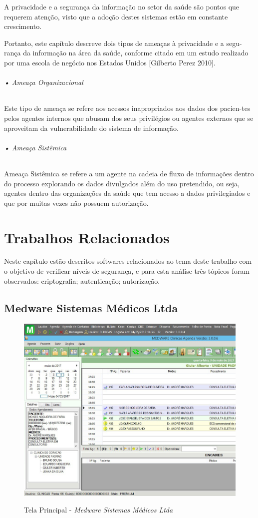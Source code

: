 \documentclass[portuguese,oneside]{tcc}
\begin{document}
A privacidade e a segurança da informação no setor da saúde são pontos que requerem atenção, visto que a adoção destes sistemas estão em constante crescimento.

Portanto, este capítulo descreve dois tipos de ameaças à privacidade e a segu-rança da informação na área da saúde, conforme citado em um estudo realizado por uma escola de negócio nos Estados Unidos [Gilberto Perez 2010].


\subparagraph{• Ameaça Organizacional}
Este tipo de ameaça se refere aos acessos inapropriados aos dados dos pacien-tes pelos agentes internos que abusam dos seus privilégios ou agentes externos que se aproveitam da vulnerabilidade do sistema de informação.


\subparagraph{• Ameaça Sistêmica}
Ameaça Sistêmica se refere a um agente na cadeia de fluxo de informações dentro do processo explorando os dados divulgados além do uso pretendido, ou seja, agentes dentro das organizações da saúde que tem acesso a dados privilegiados e que por muitas vezes não possuem autorização.

\chapter{Trabalhos Relacionados}
\label{tab:trabalhos-relacionados}	
Neste capítulo estão descritos softwares relacionados ao tema deste trabalho com o objetivo de verificar níveis de segurança, e para esta análise três tópicos foram observados: criptografia; autenticação; autorização.

\section{Medware Sistemas Médicos Ltda}

\begin{figure}[htp]
\centering
\caption{Tela Principal - \textit{Medware Sistemas Médicos Ltda}}
\includegraphics[width=12cm]{medware}
\label{fig:CalDoseX}
\end{figure}
\end{document}
